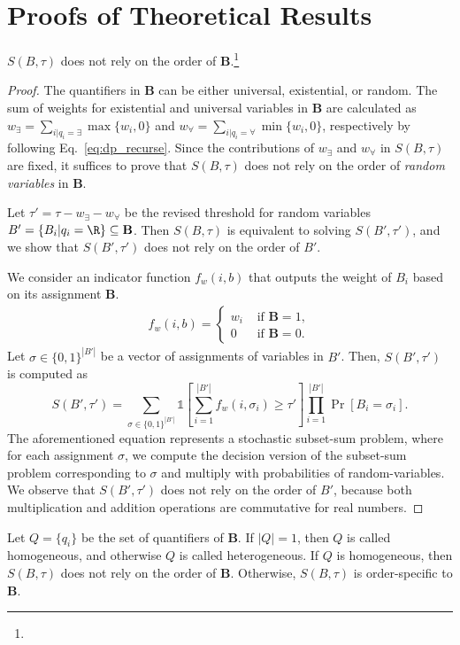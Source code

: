 		\section{Proofs of Theoretical Results}
		\iffalse
		\begin{lemmarep}
			$ S(B,\tau) $ does not rely on the order of $\mathbf{B}$.\footnote{}
		\end{lemmarep}
		\begin{proof}
		The quantifiers in $\mathbf{B}$ can be either universal, existential, or random. The sum of weights for existential and universal variables in $\mathbf{B}$ are calculated as $ w_{\exists} =  \sum_{i|q_i = \exists} \max\{w_i, 0\}$ and  $ w_{\forall} =  \sum_{i|q_i = \forall} \min\{w_i, 0\}  $, respectively by following Eq.~\eqref{eq:dp_recurse}.   Since the contributions of $ w_\exists $ and $ w_\forall $ in $S(B,\tau)$ are fixed, it suffices to prove that $ S(B,\tau) $ does not rely on the order of \textit{random variables} in $\mathbf{B}$. 
		
		Let  $ \tau' =  \tau - w_\exists - w_\forall$ be the revised threshold for random variables $ B' = \{B_i | q_i = \R\} \subseteq\mathbf{B}$. Then $ S(B,\tau) $ is equivalent to solving $ S(B', \tau') $, and we show that $ S(B', \tau') $ does not rely on the order of $ B' $.
		
		We consider an indicator function $ f_w(i, b) $ that outputs the weight of $ B_i $ based on its assignment $\mathbf{B}$. 
\begin{align*}
		f_w(i, b) = \begin{cases}
	w_i &\text{ if }\mathbf{B}= 1, \\
	0 &\text{ if }\mathbf{B}= 0.
	\end{cases}
\end{align*}
		Let $ \sigma \in \{0,1\}^{|B'|} $ be a vector of  assignments of variables in $ B' $. Then, $ S(B', \tau') $ is computed as
		\[ S(B', \tau') = \sum_{\sigma \in \{0,1\}^{|B'|}}  \mathds{1}[\sum_{i=1}^{|B'|} f_w(i, \sigma_i) \ge \tau'] \prod_{i=1}^{|B'|}\Pr[B_i = \sigma_i]. \]
		 The aforementioned equation represents a stochastic subset-sum problem, where for each assignment $ \sigma $, we compute the decision version of the subset-sum problem corresponding to $ \sigma $ and multiply with probabilities of random-variables. We observe that $ S(B',\tau') $ does not rely on the order of $ B' $, because both multiplication and addition operations are commutative for real numbers. 
			\end{proof}
		\iffalse
		\begin{lemmarep}
			Let $ Q = \{q_i\} $ be the set of quantifiers of $\mathbf{B}$. If $ |Q| = 1$, then $ Q $ is called homogeneous, and otherwise $ Q $ is called heterogeneous. If $ Q $ is homogeneous, then $ S(B,\tau) $ does not rely on the order of $\mathbf{B}$. Otherwise, $ S(B, \tau) $ is order-specific to $\mathbf{B}$.
		\end{lemmarep}
	
